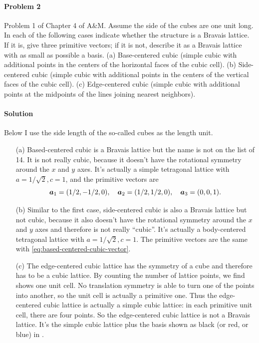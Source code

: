 \documentclass[hyperref, a4paper]{article}
\begin{document}
\paragraph{Problem 2} Problem 1 of Chapter 4 of A\&M. Assume the side of the cubes are one unit long.
In each of the following cases indicate whether the structure is a Bravais lattice. If it is, give three primitive vectors; if it is not, describe it as a Bravais lattice with as small as possible a basis.
(a) Base-centered cubic (simple cubic with additional points in the centers of the horizontal faces of the cubic cell).
(b) Side-centered cubic (simple cubic with additional points in the centers of the vertical faces of the cubic cell).
(c) Edge-centered cubic (simple cubic with additional points at the midpoints of the lines joining nearest neighbors).

\paragraph{Solution} 
Below I use the side length of the so-called cubes as the length unit.
\begin{itemize}
\item[(a)] Based-centered cubic is a Bravais lattice but the name is not on the list of 14. 
It is not really cubic, 
because it doesn't have the rotational symmetry around the $x$ and $y$ axes.
It's actually a simple tetragonal lattice with $a= 1 / \sqrt{2}, c = 1$, and
the primitive vectors are 
\begin{equation}
    \vb*{a}_1 = (1/2, -1/2, 0), \quad \vb*{a}_2 = (1/2, 1/2, 0), \quad \vb*{a}_3 = (0, 0, 1).
    \label{eq:based-centered-cubic-vector}
\end{equation}
\item[(b)] Similar to the first case, 
side-centered cubic is also a Bravais lattice but not cubic,
because it also doesn't have the rotational symmetry around the $x$ and $y$ axes
and therefore is not really ``cubic''.
It's actually a body-centered tetragonal lattice with $a= 1 / \sqrt{2}, c = 1$.
The primitive vectors are the same with \eqref{eq:based-centered-cubic-vector}.
\item[(c)] The edge-centered cubic lattice has the symmetry of a cube and therefore has to be a cubic lattice.
By counting the number of lattice points, 
we find  shows one unit cell.
No translation symmetry is able to turn one of the points into another,
so the unit cell is actually a primitive one.
Thus the edge-centered cubic lattice is actually a simple cubic lattice: 
in each primitive unit cell,
there are four points.
So the edge-centered cubic lattice is not a Bravais lattice.
It's the simple cubic lattice plus the basis shown as black (or red, or blue) in 
.
\end{itemize}
\end{document}
